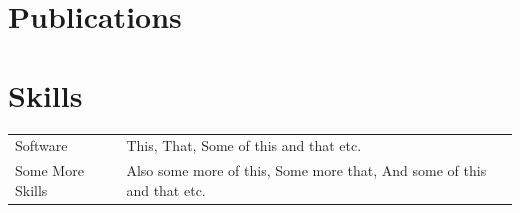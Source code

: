 \documentclass[a4paper,12pt]{article}
\begin{document}
\section{Publications}
\begin{refsection}
\nocite{*}
\printbibliography[heading=none]
\end{refsection}

\section{Skills}
\begin{tabularx}{\linewidth}{@{}l X@{}}
Software &  \normalsize{This, That, Some of this and that etc.}\\
Some More Skills  &  \normalsize{Also some more of this, Some more that, And some of this and that etc.}\\  
\end{tabularx}

\vfill
{}
\end{document}
